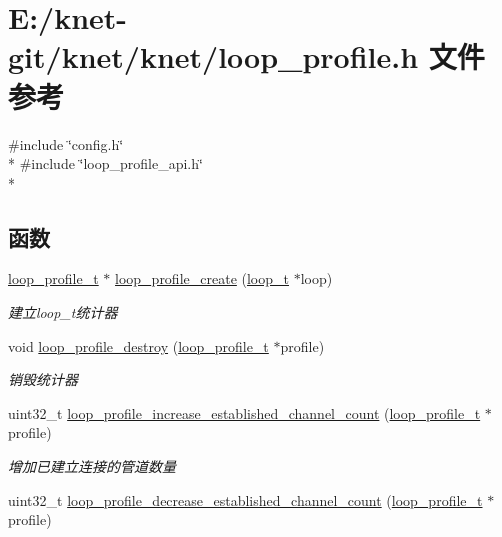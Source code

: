 \hypertarget{a00079}{}\section{E\+:/knet-\/git/knet/knet/loop\+\_\+profile.h 文件参考}
\label{a00079}
{\ttfamily \#include \char`\"{}config.\+h\char`\"{}}\\*
{\ttfamily \#include \char`\"{}loop\+\_\+profile\+\_\+api.\+h\char`\"{}}\\*
\subsection*{函数}
\begin{DoxyCompactItemize}
\item 
\hyperlink{a00051_ad060e1396346d2f5db1ec0597376a107_ad060e1396346d2f5db1ec0597376a107}{loop\+\_\+profile\+\_\+t} $\ast$ \hyperlink{a00079_adb276ec4e5559b1e167dc9045fa499bb_adb276ec4e5559b1e167dc9045fa499bb}{loop\+\_\+profile\+\_\+create} (\hyperlink{a00051_a9c3ad1cd2de83e09f3a7b59fa82c94ee_a9c3ad1cd2de83e09f3a7b59fa82c94ee}{loop\+\_\+t} $\ast$loop)
\begin{DoxyCompactList}\small\item\em 建立loop\+\_\+t统计器 \end{DoxyCompactList}\item 
void \hyperlink{a00079_a737f9f904afe15e70f56886c44372e5d_a737f9f904afe15e70f56886c44372e5d}{loop\+\_\+profile\+\_\+destroy} (\hyperlink{a00051_ad060e1396346d2f5db1ec0597376a107_ad060e1396346d2f5db1ec0597376a107}{loop\+\_\+profile\+\_\+t} $\ast$profile)
\begin{DoxyCompactList}\small\item\em 销毁统计器 \end{DoxyCompactList}\item 
uint32\+\_\+t \hyperlink{a00079_af388f071a9558df8049c51205d33361a_af388f071a9558df8049c51205d33361a}{loop\+\_\+profile\+\_\+increase\+\_\+established\+\_\+channel\+\_\+count} (\hyperlink{a00051_ad060e1396346d2f5db1ec0597376a107_ad060e1396346d2f5db1ec0597376a107}{loop\+\_\+profile\+\_\+t} $\ast$profile)
\begin{DoxyCompactList}\small\item\em 增加已建立连接的管道数量 \end{DoxyCompactList}\item 
uint32\+\_\+t \hyperlink{a00079_a7cfc0ba3d4b5083413f330b519e38eec_a7cfc0ba3d4b5083413f330b519e38eec}{loop\+\_\+profile\+\_\+decrease\+\_\+established\+\_\+channel\+\_\+count} (\hyperlink{a00051_ad060e1396346d2f5db1ec0597376a107_ad060e1396346d2f5db1ec0597376a107}{loop\+\_\+profile\+\_\+t} $\ast$profile)

\end{DoxyCompactItemize}

